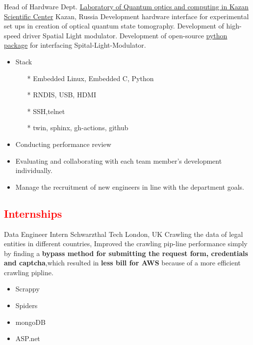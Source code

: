         {Head of Hardware Dept.}
        {\href{http://kfti.knc.ru/}{\color{blue}Laboratory of Quantum optics and  computing  in  Kazan Scientific Center}}
        {Kazan, Russia}
        {
        \newline
        Development hardware interface for experimental set ups in creation of optical quantum state tomography. 
        Development of high-speed driver Spatial Light modulator.
        Development of open-source \href{https://pypi.org/project/holoeye-embedded/}{\color{blue}python package} for interfacing Spital-Light-Modulator.    
        } 
        {
        \begin{itemize}
            \item Stack
                \begin{itemize}
                \item[*] Embedded Linux, Embedded C, Python
                \item[*] RNDIS, USB, HDMI
                \item[*] SSH,telnet
                \item[*] twin, sphinx, gh-actions, github
                \end{itemize}
            \item Conducting performance review
            \item Evaluating and collaborating with each team member’s development individually.
            \item Manage the recruitment of new engineers in line with the department goals.
        \end{itemize}
        }

\newpage
\vspace{2mm}
\subsection{\Large{\textcolor{red}{Internships}}}


                {Data Engineer Intern}
                {Schwarzthal Tech}
                {London, UK}
                {
                \newline
                Crawling the data of legal entities in different countries, Improved the crawling pip-line performance simply by finding a  \textbf{bypass method for submitting the request form, credentials and captcha},which resulted in \textbf{less bill for AWS} because of a more efficient crawling pipline.  } 
                {
                \begin{itemize}
                    \item Scrappy
                    \item Spiders
                    \item mongoDB
                    \item ASP.net 
                \end{itemize}
                }
        
